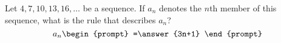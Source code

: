 \documentclass{ximera}
\author{Gregory Hartman \and Matthew Carr}
\begin{document}
\begin{exercise}



Let  $4, 7, 10, 13, 16, \ldots$ be a sequence. If $a_n$ denotes the $n$th member of this sequence, what is the rule that describes $a_n$?
\[
a_n
\begin{prompt}
=\answer{3n+1}
\end{prompt}
\]

\end{exercise}
\end{document}
